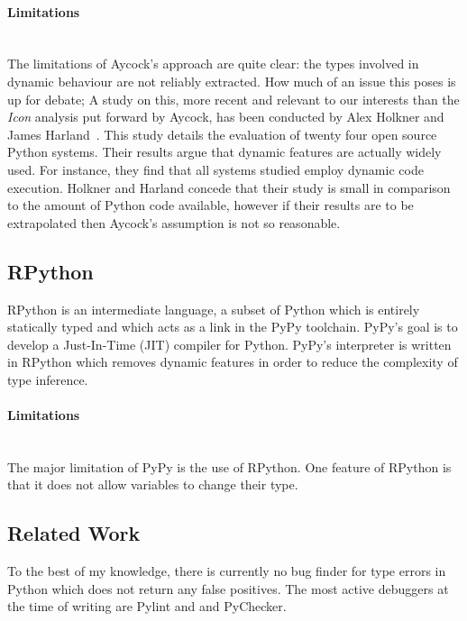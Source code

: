 \documentclass[12pt, titlepage]{article}
\begin{document}
\paragraph{Limitations}\mbox{}\\
The limitations of Aycock's approach are quite clear: the types involved in dynamic behaviour are not reliably extracted. How much of an issue this poses is up for debate;
A study on this, more recent and relevant to our interests than the \textit{Icon} analysis put forward by Aycock, has been conducted by Alex Holkner and James Harland~\cite{evaluatingDynamicBehaviour}. This study details the evaluation of twenty four open source Python systems. Their results argue that dynamic features are actually widely used. For instance, they find that all systems studied employ dynamic code execution. Holkner and Harland concede that their study is small in comparison to the amount of Python code available, however if their results are to be extrapolated then Aycock's assumption is not so reasonable.

\subsection{RPython}
RPython is an intermediate language, a subset of Python which is entirely statically typed and which acts as a link in the PyPy toolchain. PyPy's goal is to develop a Just-In-Time (JIT) compiler for Python. PyPy's interpreter is written in RPython which removes dynamic features in order to reduce the complexity of type inference.
\paragraph{Limitations}\mbox{}\\
The major limitation of PyPy is the use of RPython. One feature of RPython is that it does not allow variables to change their type.

\subsection{Related Work}
To the best of my knowledge, there is currently no bug finder for type errors in Python which does not return any false positives. The most active debuggers at the time of writing are Pylint and and PyChecker.
\end{document}
